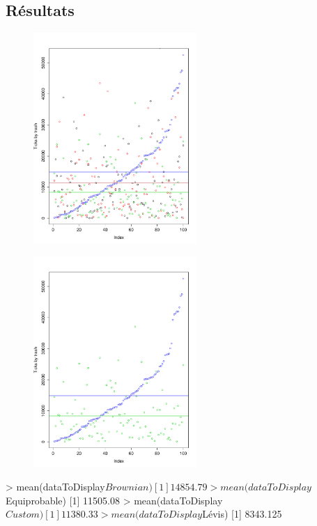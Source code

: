 \subsection{Résultats}


\begin{figure}[H]
	\begin{center}
		\includegraphics[height=8cm]{diagrams/1Tr_all.pdf}
		\caption{}
		\label{fig:}
	\end{center}
\end{figure}


\begin{figure}[H]
	\begin{center}
		\includegraphics[height=8cm]{diagrams/1Tr_brow_levis.pdf}
		\caption{}
		\label{fig:}
	\end{center}
\end{figure}


> mean(dataToDisplay$Brownian)
[1] 14854.79
> mean(dataToDisplay$Equiprobable)
[1] 11505.08
> mean(dataToDisplay$Custom)
[1] 11380.33
> mean(dataToDisplay$Lévis)
[1] 8343.125